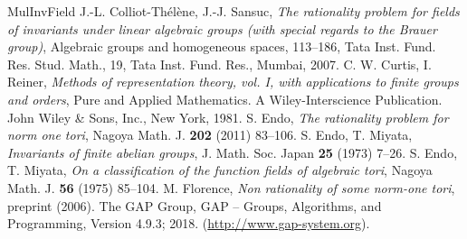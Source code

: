 \documentclass{amsart}
\theoremstyle{plain}
\theoremstyle{definition}
\theoremstyle{remark}
\begin{document}
{\begin{thebibliography}{MulInvField}
J.-L. Colliot-Th\'{e}l\`{e}ne, J.-J. Sansuc, 
{\it The rationality problem for fields of invariants 
under linear algebraic groups (with special regards to the Brauer group)}, 
Algebraic groups and homogeneous spaces, 113--186, 
Tata Inst. Fund. Res. Stud. Math., 19, Tata Inst. Fund. Res., Mumbai, 2007.
C. W. Curtis, I. Reiner, 
{\it Methods of representation theory, vol. I, 
with applications to finite groups and orders}, 
Pure and Applied Mathematics. A Wiley-Interscience Publication. 
John Wiley \& Sons, Inc., New York, 1981.
S. Endo, 
{\it The rationality problem for norm one tori}, 
Nagoya Math. J. \textbf{202} (2011) 83--106. 
S. Endo, T. Miyata, 
{\it Invariants of finite abelian groups}, 
J. Math. Soc. Japan \textbf{25} (1973) 7--26. 
S. Endo, T. Miyata, 
{\it On a classification of the function fields of algebraic tori}, 
Nagoya Math. J. \textbf{56} (1975) 85--104.
M. Florence, 
{\it Non rationality of some norm-one tori}, preprint (2006).
The GAP Group, GAP -- Groups, Algorithms, and Programming, 
Version 4.9.3; 2018. (\url{http://www.gap-system.org}).

\end{thebibliography}}
\end{document}
